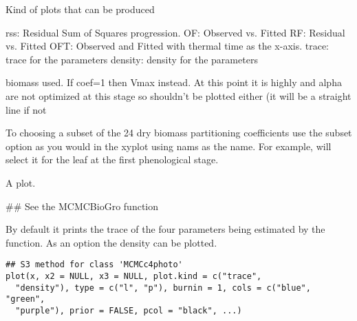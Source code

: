 \documentclass[letterpaper]{book}
\begin{document}
\begin{Details}\relax
Kind of plots that can be produced

rss: Residual Sum of Squares progression.  OF: Observed vs.
Fitted RF: Residual vs. Fitted OFT: Observed and Fitted
with thermal time as the x-axis.  trace: trace for the
parameters density: density for the parameters


biomass 
used. If coef=1 then Vmax 
instead. At this point it is highly 
and alpha are not optimized at this stage so 
shouldn't be plotted either (it will be a straight line if
not 

To choosing a subset of the 24 dry biomass partitioning
coefficients use the subset option as you would in the
xyplot using nams as the name. For example,
will select it for the leaf at the first phenological
stage.
\end{Details}
%
\begin{Value}
A  plot.
\end{Value}
%
\begin{SeeAlso}\relax
{}
\end{SeeAlso}
%
\begin{Examples}
\begin{ExampleCode}
## See the MCMCBioGro function
\end{ExampleCode}
\end{Examples}
%
\begin{Description}\relax
By default it prints the trace of the four parameters being
estimated by the  function. As an
option the density can be plotted.
\end{Description}
%
\begin{Usage}
\begin{verbatim}
## S3 method for class 'MCMCc4photo'
plot(x, x2 = NULL, x3 = NULL, plot.kind = c("trace",
  "density"), type = c("l", "p"), burnin = 1, cols = c("blue", "green",
  "purple"), prior = FALSE, pcol = "black", ...)
\end{verbatim}
\end{Usage}
%
\end{document}
